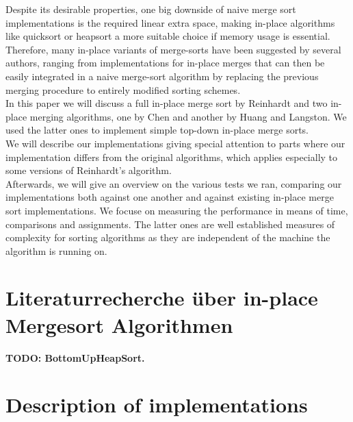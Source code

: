 \documentclass[11pt,pdftex,a4paper, twocolumn]{article}
\begin{document}
Despite its desirable properties, one big downside of naive merge sort implementations is the required linear extra space, making in-place algorithms like quicksort or heapsort a more suitable choice if memory usage is essential. \\
Therefore, many in-place variants of merge-sorts have been suggested by several authors, ranging from implementations for in-place merges that can then be easily integrated in a naive merge-sort algorithm by replacing the previous merging procedure to entirely modified sorting schemes. \\
In this paper we will discuss a full in-place merge sort by Reinhardt\cite{Reinhardt92} and two in-place merging algorithms, one by Chen\cite{Chen06} and another by Huang and Langston\cite{huang1988practical}. We used the latter ones to implement simple top-down in-place merge sorts. \\
We will describe our implementations giving special attention to parts where our implementation differs from the original algorithms, which applies especially to some versions of Reinhardt’s algorithm. \\
Afterwards, we will give an overview on the various tests we ran, comparing our implementations both against one another and against existing in-place merge sort implementations. We focuse on measuring the performance in means of time, comparisons and assignments. The latter ones are well established measures of complexity for sorting algorithms as they are independent of the machine the algorithm is running on. \\

\section*{Literaturrecherche \"uber in-place Mergesort Algorithmen}
\textbf{TODO: BottomUpHeapSort\cite{wegener1993bottom}.}

\section*{Description of implementations}
\end{document}
